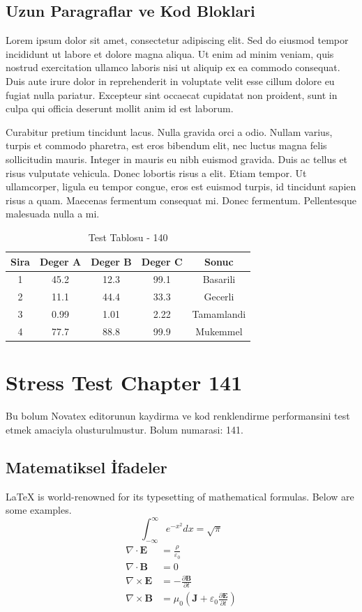 \documentclass[12pt,a4paper]{article}
\begin{document}
\subsection{Uzun Paragraflar ve Kod Bloklari}
Lorem ipsum dolor sit amet, consectetur adipiscing elit. Sed do eiusmod tempor incididunt ut labore et dolore magna aliqua. Ut enim ad minim veniam, quis nostrud exercitation ullamco laboris nisi ut aliquip ex ea commodo consequat. Duis aute irure dolor in reprehenderit in voluptate velit esse cillum dolore eu fugiat nulla pariatur. Excepteur sint occaecat cupidatat non proident, sunt in culpa qui officia deserunt mollit anim id est laborum.

Curabitur pretium tincidunt lacus. Nulla gravida orci a odio. Nullam varius, turpis et commodo pharetra, est eros bibendum elit, nec luctus magna felis sollicitudin mauris. Integer in mauris eu nibh euismod gravida. Duis ac tellus et risus vulputate vehicula. Donec lobortis risus a elit. Etiam tempor. Ut ullamcorper, ligula eu tempor congue, eros est euismod turpis, id tincidunt sapien risus a quam. Maecenas fermentum consequat mi. Donec fermentum. Pellentesque malesuada nulla a mi.

\begin{table}[h!]
\centering
\begin{tabular}{|c|c|c|c|c|}
\hline
\textbf{Sira} & \textbf{Deger A} & \textbf{Deger B} & \textbf{Deger C} & \textbf{Sonuc} \\
\hline
1 & 45.2 & 12.3 & 99.1 & Basarili \\
2 & 11.1 & 44.4 & 33.3 & Gecerli \\
3 & 0.99 & 1.01 & 2.22 & Tamamlandi \\
4 & 77.7 & 88.8 & 99.9 & Mukemmel \\
\hline
\end{tabular}
\caption{Test Tablosu - 140}
\end{table}

\newpage
\section{Stress Test Chapter 141}
Bu bolum Novatex editorunun kaydirma ve kod renklendirme performansini test etmek amaciyla olusturulmustur. Bolum numarasi: 141.

\subsection{Matematiksel İfadeler}
\LaTeX{} is world-renowned for its typesetting of mathematical formulas. Below are some examples.
\begin{equation}
\int_{-\infty}^{\infty} e^{-x^2} dx = \sqrt{\pi}
\end{equation}
\begin{align}
\nabla \cdot \mathbf{E} &= \frac{\rho}{\varepsilon_0} \\
\nabla \cdot \mathbf{B} &= 0 \\
\nabla \times \mathbf{E} &= -\frac{\partial \mathbf{B}}{\partial t} \\
\nabla \times \mathbf{B} &= \mu_0\left(\mathbf{J} + \varepsilon_0 \frac{\partial \mathbf{E}}{\partial t}\right)
\end{align}
\end{document}

